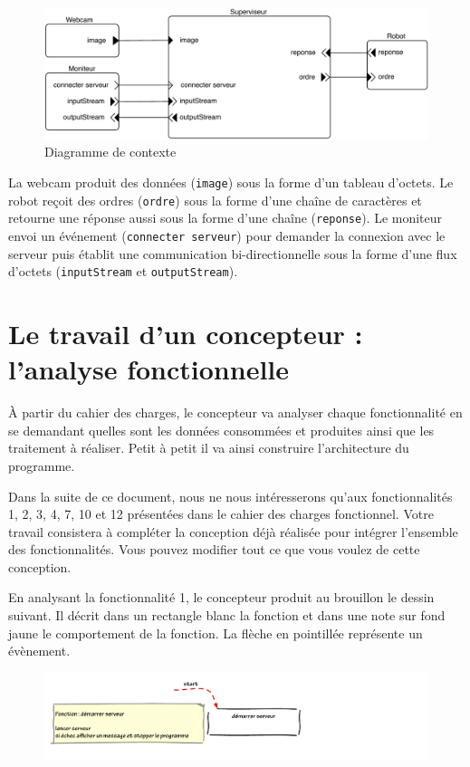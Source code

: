 \documentclass[11pt,a4paper]{paper}
\begin{document}
 \begin{figure}[htbp]
\begin{center}
\includegraphics[scale=0.6]{figures_pdf/contexte}
\caption{Diagramme de contexte}
\label{fig:contexte}
\end{center}
\end{figure}
\FloatBarrier

La webcam produit des données (\texttt{image}) sous la forme d'un tableau d'octets. Le robot reçoit des ordres (\texttt{ordre}) sous la forme d'une chaîne de caractères et retourne une réponse aussi sous la forme d'une chaîne (\texttt{reponse}). Le moniteur envoi un événement (\texttt{connecter serveur}) pour demander la connexion avec le serveur puis établit une communication bi-directionnelle sous la forme d'une flux d'octets (\texttt{inputStream} et \texttt{outputStream}).

\section{Le travail d'un concepteur : l'analyse fonctionnelle}

À partir du cahier des charges, le concepteur va analyser chaque fonctionnalité en se demandant quelles sont les données consommées et produites ainsi que les traitement à réaliser. Petit à petit il va ainsi construire l'architecture du programme.

Dans la suite de ce document, nous ne nous intéresserons qu'aux fonctionnalités 1, 2, 3, 4, 7, 10 et 12 présentées dans le cahier des charges fonctionnel. Votre travail consistera à compléter la conception déjà réalisée pour intégrer l'ensemble des fonctionnalités. Vous pouvez modifier tout ce que vous voulez de cette conception.

En analysant la fonctionnalité 1, le concepteur produit au brouillon le dessin suivant. Il décrit dans un rectangle blanc la fonction et dans une note sur fond jaune le comportement de la fonction. La flèche en pointillée représente un évènement. 
 \begin{figure}[htbp]
\begin{center}
\includegraphics[scale=0.5]{figures_pdf/fonc/fonc1}
\end{center}
\end{figure}
\FloatBarrier
\end{document}
